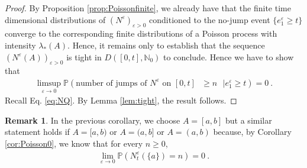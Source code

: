 \documentclass[reqno, 12pt, a4paper]{amsart}
\theoremstyle{plain}
\theoremstyle{definition}
\newtheorem{remark}[theorem]{Remark}
\begin{document}
\begin{proof}
By Proposition \ref{prop:Poissonfinite}, we already have that the finite time dimensional distributions of $(N^\varepsilon)_{\varepsilon>0}$ conditioned to the no-jump event $\{e_1^\varepsilon \ge t\}$ converge to the corresponding finite distributions of a Poisson process with intensity $\lambda_* (A)$. Hence, it remains only to establish that the sequence $(N^{\varepsilon} (A))_{\varepsilon>0}$ is tight in $D([0,t], \mathbb N_0)$ to conclude. Hence we have to show that
\begin{equation}
\begin{split}
\limsup_{\varepsilon \to 0} \mathbb P (\text{number of jumps of $N^\varepsilon$ on $[0,t]$ $\ge n$  $\vert e_1^\varepsilon \ge t$} ) = 0  \ .
\end{split}
\end{equation}
 Recall Eq. \eqref{eq:NQ}. By Lemma \ref{lem:tight}, the result follows.

\end{proof}

\begin{remark}
\label{rem:closedopen}
In the previous corollary, we choose $A=[a,b]$ but a similar statement holds if $A=[a,b)$ or $A=(a,b]$ or $A=(a,b)$ because, by Corollary \ref{cor:Poisson0}, we know that for every $n \ge 0$, 
\begin{equation}
\begin{split}
\lim_{\varepsilon \to 0} \mathbb P (N^{\varepsilon}_t (\{a\}) = n ) = 0 \  . 
\end{split}
\end{equation}
\end{remark}
\end{document}
